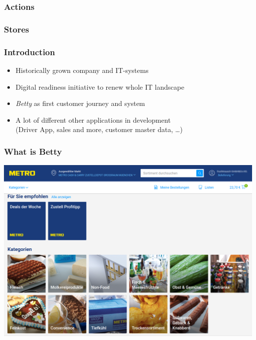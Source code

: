 \documentclass{beamer}
\begin{document}
\begin{frame}\frametitle{Actions}
\centering
{}
\end{frame}

\begin{frame}\frametitle{Stores}
\centering
{}
\end{frame}

\begin{frame}\frametitle{Introduction}
\centering
\begin{itemize}
\item Historically grown company and IT-systems
\item Digital readiness initiative to renew whole IT landscape
\item \textit{Betty} as first customer journey and system
\item A lot of different other applications in development\\
(Driver App, sales and more, customer master data, …)
\end{itemize}
\end{frame}

\begin{frame}\frametitle{What is Betty}
\centering
\begin{center}
\includegraphics[width=.85\linewidth,height=.85\textheight,keepaspectratio]{Betty.png}
\end{center}
\end{frame}
\end{document}

